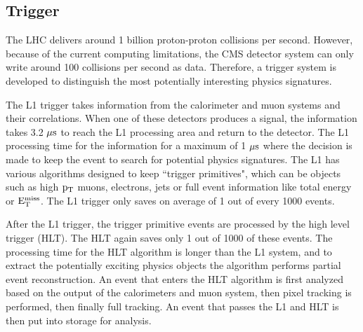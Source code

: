\subsection{Trigger}
The LHC delivers around 1 billion proton-proton collisions per second.  
However, because of the current computing limitations, the CMS detector system can only write around 100 collisions per second as data.  
Therefore, a trigger system is developed to distinguish the most potentially interesting physics signatures.  

The L1 trigger takes information from the calorimeter and muon systems and their correlations.  
When one of these detectors produces a signal, the information takes 3.2 $\mathrm{\mu s}$ to reach the L1 processing area and return to the detector.  
The L1 processing time for the information for a maximum of 1 $\mathrm{\mu s}$ where the decision is made to keep the event to search for potential physics signatures.  
The L1 has various algorithms designed to keep ``trigger primitives", which can be objects such as high $\mathrm{p_{T}}$ muons, electrons, jets or full event information like total energy or $\mathrm{E_{T}^{miss}}$.  
The L1 trigger only saves on average of 1 out of every 1000 events.  

After the L1 trigger, the trigger primitive events are processed by the high level trigger (HLT).  
The HLT again saves only 1 out of 1000 of these events.  
The processing time for the HLT algorithm is longer than the L1 system, and to extract the potentially exciting physics objects the algorithm performs partial event reconstruction.  
An event that enters the HLT algorithm is first analyzed based on the output of the calorimeters and muon system, then pixel tracking is performed, then finally full tracking.  
An event that passes the L1 and HLT is then put into storage for analysis.  



